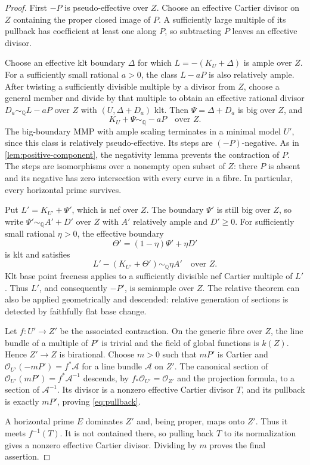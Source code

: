 \documentclass[11pt]{article}
\numberwithin{equation}{section}
\theoremstyle{definition}
\newcommand{\Q}{\mathbb Q}
\newcommand{\OO}{\mathcal O}
\newcommand{\simq}{\sim_{\Q}}
\begin{document}
\begin{proof}
First $-P$ is pseudo-effective over $Z$. Choose an effective Cartier
divisor on $Z$ containing the proper closed image of $P$. A sufficiently
large multiple of its pullback has coefficient at least one along
$P$, so subtracting $P$ leaves an effective divisor.

Choose an effective klt boundary $\Delta$ for which
$L=-(K_U+\Delta)$ is ample over $Z$. For a sufficiently small rational
$a>0$, the class $L-aP$ is also relatively ample. After twisting a
sufficiently divisible multiple by a divisor from $Z$, choose a
general member and divide by that multiple to obtain an effective
rational divisor $D_a\simq L-aP$ over $Z$ with $(U,\Delta+D_a)$ klt.
Then $\Psi=\Delta+D_a$ is big over $Z$, and
\[
 K_U+\Psi\simq-aP\quad\text{over }Z.
\]
The big-boundary MMP with ample scaling terminates in a minimal model
$U'$, since this class is relatively pseudo-effective. Its steps are
$(-P)$-negative. As in \cref{lem:positive-component}, the negativity
lemma prevents the contraction of $P$. The steps are isomorphisms over
a nonempty open subset of $Z$: there $P$ is absent and its negative
has zero intersection with every curve in a fibre. In particular,
every horizontal prime survives.

Put $L'=K_{U'}+\Psi'$, which is nef over $Z$. The boundary $\Psi'$ is
still big over $Z$, so write $\Psi'\simq A'+D'$ over $Z$ with $A'$
relatively ample and $D'\geq0$. For sufficiently small rational
$\eta>0$, the effective boundary
\[
 \Theta'=(1-\eta)\Psi'+\eta D'
\]
is klt and satisfies
\[
 L'-(K_{U'}+\Theta')\simq\eta A'\quad\text{over }Z.
\]
Klt base point freeness applies to a sufficiently divisible nef
Cartier multiple of $L'$ \cite[Theorem~11.1]{LyuMurayama}. Thus $L'$, and consequently $-P'$, is
semiample over $Z$. The relative theorem can also be applied
geometrically and descended: relative generation of sections is
detected by faithfully flat base change.

Let $f:U'\to Z'$ be the associated contraction. On the generic fibre
over $Z$, the line bundle of a multiple of $P'$ is trivial and the
field of global functions is $k(Z)$. Hence $Z'\to Z$ is birational.
Choose $m>0$ such that $mP'$ is Cartier and
$\OO_{U'}(-mP')=f^*\mathcal A$ for a line bundle $\mathcal A$ on
$Z'$. The canonical section of
$\OO_{U'}(mP')=f^*\mathcal A^{-1}$ descends, by
$f_*\OO_{U'}=\OO_{Z'}$ and the projection formula, to a section of
$\mathcal A^{-1}$. Its divisor is a nonzero effective Cartier divisor
$T$, and its pullback is exactly $mP'$, proving \eqref{eq:pullback}.

A horizontal prime $E$ dominates $Z'$ and, being proper, maps onto
$Z'$. Thus it meets $f^{-1}(T)$. It is not contained there, so pulling
back $T$ to its normalization gives a nonzero effective Cartier
divisor. Dividing by $m$ proves the final assertion.
\end{proof}
\end{document}
